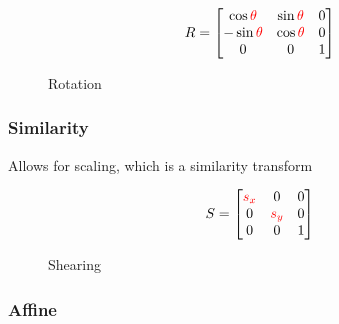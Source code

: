 \documentclass[11pt]{article}
\begin{document}
\begin{minipage}[c]{0.5\linewidth}
    \begin{equation*}
        R = \begin{bmatrix}
            \cos \color{red}{\theta} & \sin \color{red}{\theta} & 0 \\ 
            -\sin \color{red}{\theta} & \cos \color{red}{\theta} & 0 \\ 
            0 & 0 & 1
        \end{bmatrix}
    \end{equation*}
\end{minipage}\hfill
\begin{minipage}[c]{0.5\linewidth}
    \begin{figure}[H]
        \centering
        \caption*{Rotation}
    \end{figure}
\end{minipage}

\subsubsection{Similarity}

Allows for scaling, which is a similarity transform

\begin{minipage}[c]{0.5\linewidth}
    \begin{equation*}
        S = \begin{bmatrix}
            \color{red}{s_x} & 0 & 0 \\ 
            0 & \color{red}{s_y} & 0 \\ 
            0 & 0 & 1
        \end{bmatrix}
    \end{equation*}
\end{minipage}\hfill
\begin{minipage}[c]{0.5\linewidth}
    \begin{figure}[H]
        \centering
        \caption*{Shearing}
    \end{figure}
\end{minipage}

\subsubsection{Affine}
\end{document}
